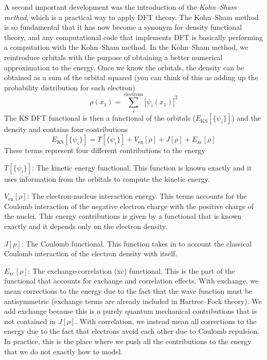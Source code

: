 \documentclass[../Main/notes.tex]{subfiles}
\begin{document}
A second important development was the introduction of the \emph{Kohn--Sham method}, which is a practical way to apply DFT theory.
The Kohn--Sham method is so fundamental that it has now become a synonym for density functional theory, and any computational code that implements DFT is basically performing a computation with the Kohn--Sham method.
In the Kohn--Sham method, we reintroduce orbitals with the purpose of obtaining a better numerical approximation to the energy.
Once we know the orbitals, the density can be obtained as a sum of the orbital squared (you can think of this as adding up the probability distribution for each electron)
\begin{equation}
\rho(x_1) = \sum_i^{\mathrm{electrons}} |\psi_i(x_1)|^2
\end{equation}
The KS DFT functional is then a functional of the orbitals ($E_\mathrm{KS} [\{\psi_i\}]$) and the density and contains four contributions
\begin{equation}
\label{eq:dft:ksenergy}
E_\mathrm{KS} [\{\psi_i\}] = T[\{\psi_i\}] + V_\mathrm{en}[\rho] + J[\rho] + E_\mathrm{xc}[\rho]
\end{equation}
These terms represent four different contributions to the energy
\begin{myitems}
\item $T[\{\psi_i\}]$: The kinetic energy functional. This function is known exactly and it uses information from the orbitals to compute the kinetic energy.
\item $V_\mathrm{en}[\rho]$: The electron-nucleus interaction energy. This terms accounts for the Coulomb interaction of the negative electron charge with the positive charge of the nuclei. This energy contributions is given by a functional that is known exactly and it depends only on the electron density.
\item $J[\rho]$: The Coulomb functional. This function takes in to account the classical Coulomb interaction of the electron density with itself.
\item $E_\mathrm{xc}[\rho]$: The exchange-correlation (xc) functional. This is the part of the functional that accounts for exchange and correlation effects. With exchange, we mean corrections to the energy due to the fact that the wave function must be antisymmetric (exchange terms are already included in Hartree--Fock theory). We add exchange because this is a purely quantum mechanical contributions that is not contained in $J[\rho]$.
With correlation, we instead mean all corrections to the energy due to the fact that electrons avoid each other due to Coulomb repulsion. In practice, this is the place where we push all the contributions to the energy that we do not exactly how to model.
\end{myitems}
\end{document}
